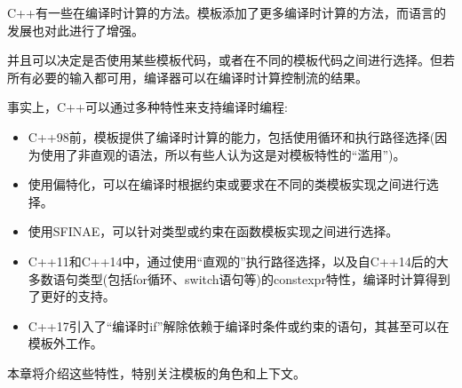 C++有一些在编译时计算的方法。模板添加了更多编译时计算的方法，而语言的发展也对此进行了增强。

并且可以决定是否使用某些模板代码，或者在不同的模板代码之间进行选择。但若所有必要的输入都可用，编译器可以在编译时计算控制流的结果。

事实上，C++可以通过多种特性来支持编译时编程:

\begin{itemize}
\item 
C++98前，模板提供了编译时计算的能力，包括使用循环和执行路径选择(因为使用了非直观的语法，所以有些人认为这是对模板特性的“滥用”)。

\item 
使用偏特化，可以在编译时根据约束或要求在不同的类模板实现之间进行选择。

\item 
使用SFINAE，可以针对类型或约束在函数模板实现之间进行选择。

\item 
C++11和C++14中，通过使用“直观的”执行路径选择，以及自C++14后的大多数语句类型(包括for循环、switch语句等)的constexpr特性，编译时计算得到了更好的支持。

\item 
C++17引入了“编译时if”解除依赖于编译时条件或约束的语句，其甚至可以在模板外工作。
\end{itemize}

本章将介绍这些特性，特别关注模板的角色和上下文。


